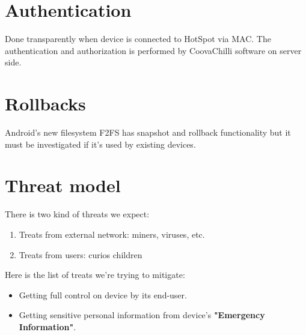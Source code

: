 \section{Authentication}

Done transparently when device is connected to HotSpot via MAC. The
authentication and authorization is performed by CoovaChilli software
on server side.


\section{Rollbacks}

Android's new filesystem F2FS has snapshot and rollback functionality
but it must be investigated if it's used by existing devices.


\section{Threat model}

There is two kind of threats we expect:

\begin{enumerate}
\item Treats from external network: miners, viruses, etc.
\item Treats from users: curios children
\end{enumerate}

Here is the list of treats we're trying to mitigate:

\begin{itemize}
\item Getting full control on device by its end-user.
\item Getting sensitive personal information from device's
\textbf{"Emergency Information"}.
\end{itemize}

